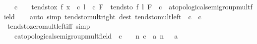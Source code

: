 \begin{isabellebody}
\ \ \ {\isachardoublequoteopen}c\ {\isasymnoteq}\ {}\ {\isasymLongrightarrow}\ tendsto{\isacharparenleft}{\kern0pt}{\isasymlambda}x{\isachardot}{\kern0pt}\ f\ x\ {\isacharasterisk}{\kern0pt}\ c{\isacharparenright}{\kern0pt}\ {\isacharparenleft}{\kern0pt}l\ {\isacharasterisk}{\kern0pt}\ c{\isacharparenright}{\kern0pt}\ F\ {\isasymlongleftrightarrow}\ tendsto\ f\ l\ F{\isachardoublequoteclose}\ \ c\ {\isacharcolon}{\kern0pt}{\isacharcolon}{\kern0pt}\ {\isachardoublequoteopen}{\isacharprime}{\kern0pt}a{\isacharcolon}{\kern0pt}{\isacharcolon}{\kern0pt}{\isacharbraceleft}{\kern0pt}topological{\isacharunderscore}{\kern0pt}semigroup{\isacharunderscore}{\kern0pt}mult{\isacharcomma}{\kern0pt}field{\isacharbraceright}{\kern0pt}{\isachardoublequoteclose}\isanewline
%
\isadelimproof
\ \ %
\endisadelimproof
%
\isatagproof
{}\isamarkupfalse%
\ {\isacharparenleft}{\kern0pt}auto\ simp{\isacharcolon}{\kern0pt}\ tendsto{\isacharunderscore}{\kern0pt}mult{\isacharunderscore}{\kern0pt}right\ dest{\isacharcolon}{\kern0pt}\ tendsto{\isacharunderscore}{\kern0pt}mult{\isacharunderscore}{\kern0pt}left\ {\isacharbrackleft}{\kern0pt}\ c\ {\isacharequal}{\kern0pt}\ {\isachardoublequoteopen}{}{\isacharslash}{\kern0pt}c{\isachardoublequoteclose}{\isacharbrackright}{\kern0pt}{\isacharparenright}{\kern0pt}%
\endisatagproof
{\isafoldproof}%
%
\isadelimproof
\isanewline
%
\endisadelimproof
\isanewline
{}\isamarkupfalse%
\ tendsto{\isacharunderscore}{\kern0pt}zero{\isacharunderscore}{\kern0pt}mult{\isacharunderscore}{\kern0pt}left{\isacharunderscore}{\kern0pt}iff\ {\isacharbrackleft}{\kern0pt}simp{\isacharbrackright}{\kern0pt}{\isacharcolon}{\kern0pt}\isanewline
\ \ \ c{\isacharcolon}{\kern0pt}{\isacharcolon}{\kern0pt}{\isachardoublequoteopen}{\isacharprime}{\kern0pt}a{\isacharcolon}{\kern0pt}{\isacharcolon}{\kern0pt}{\isacharbraceleft}{\kern0pt}topological{\isacharunderscore}{\kern0pt}semigroup{\isacharunderscore}{\kern0pt}mult{\isacharcomma}{\kern0pt}field{\isacharbraceright}{\kern0pt}{\isachardoublequoteclose}\ \ {\isachardoublequoteopen}c\ {\isasymnoteq}\ {}{\isachardoublequoteclose}\ \ {\isachardoublequoteopen}{\isacharparenleft}{\kern0pt}{\isasymlambda}n{\isachardot}{\kern0pt}\ c\ {\isacharasterisk}{\kern0pt}\ a\ n{\isacharparenright}{\kern0pt}{\isasymlonglonglongrightarrow}\ {}\ {\isasymlongleftrightarrow}\ a\ {\isasymlonglonglongrightarrow}\ {}{\isachardoublequoteclose}\isanewline
%
\isadelimproof
\ \ %
\endisadelimproof

\end{isabellebody}
